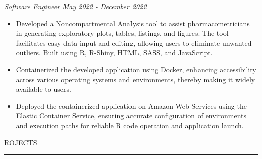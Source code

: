 \documentclass[11pt]{article}
\begin{document}
\textbf{\scalebox{1.2}{Ann Arbor Pharmacometrics Group}} \hfill \scalebox{1.1}{Ann Arbor, Michigan}
\par \textit{Software Engineer} \hfill \textit{May 2022 - December 2022}
{
\small
\begin{itemize}
    \item Developed a Noncompartmental Analysis tool to assist pharmacometricians in generating exploratory plots, tables, listings, and figures. The tool facilitates easy data input and editing, allowing users to eliminate unwanted outliers. Built using R, R-Shiny, HTML, SASS, and JavaScript.
    \item Containerized the developed application using Docker, enhancing accessibility across various operating systems and environments, thereby making it widely available to users.
    \item Deployed the containerized application on Amazon Web Services using the Elastic Container Service, ensuring accurate configuration of environments and execution paths for reliable R code operation and application launch.
\end{itemize}
}


\par \scalebox{1.3}{P}ROJECTS                  
\par \vspace{-0.1in} \noindent\rule{7.8in}{0.5pt} 
\end{document}

